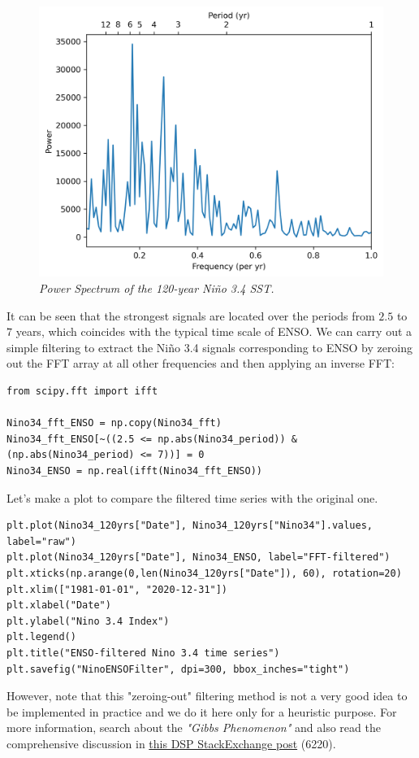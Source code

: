 \begin{figure}[ht!]
    \centering
    \includegraphics[scale=0.75]{graphics/NinoFFT.png}
    \caption{\textit{Power Spectrum of the 120-year Niño 3.4 SST.}}
    \label{fig:Nino1}
\end{figure}
It can be seen that the strongest signals are located over the periods from $2.5$ to $7$ years, which coincides with the typical time scale of ENSO. We can carry out a simple filtering to extract the Niño 3.4 signals corresponding to ENSO by zeroing out the FFT array at all other frequencies and then applying an inverse FFT: 
\begin{lstlisting}
from scipy.fft import ifft

Nino34_fft_ENSO = np.copy(Nino34_fft)
Nino34_fft_ENSO[~((2.5 <= np.abs(Nino34_period)) & (np.abs(Nino34_period) <= 7))] = 0
Nino34_ENSO = np.real(ifft(Nino34_fft_ENSO))
\end{lstlisting}
Let's make a plot to compare the filtered time series with the original one.
\begin{lstlisting}
plt.plot(Nino34_120yrs["Date"], Nino34_120yrs["Nino34"].values, label="raw")
plt.plot(Nino34_120yrs["Date"], Nino34_ENSO, label="FFT-filtered")
plt.xticks(np.arange(0,len(Nino34_120yrs["Date"]), 60), rotation=20)
plt.xlim(["1981-01-01", "2020-12-31"])
plt.xlabel("Date")
plt.ylabel("Nino 3.4 Index")
plt.legend()
plt.title("ENSO-filtered Nino 3.4 time series")
plt.savefig("NinoENSOFilter", dpi=300, bbox_inches="tight")
\end{lstlisting}
However, note that this "zeroing-out" filtering method is not a very good idea to be implemented in practice and we do it here only for a heuristic purpose. For more information, search about the \textit{"Gibbs Phenomenon"} and also read the comprehensive discussion in   \href{https://stackoverflow.com/questions/31256252/why-does-numpy-linalg-solve-offer-more-precise-matrix-inversions-than-numpy-li}{this DSP StackExchange post} (6220).
